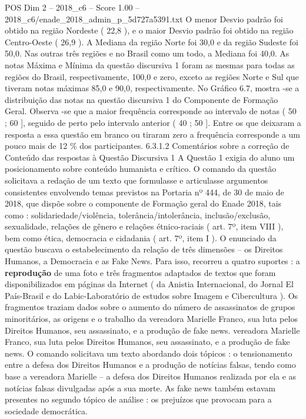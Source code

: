 \begin{textsample}{POS Dim 2 – 2018\_c6 – Score 1.00 – 2018\_c6/enade\_2018\_admin\_p\_5d727a5391.txt}
O menor Desvio padrão foi obtido na região Nordeste ( 22,8 ), e o maior Desvio padrão foi obtido na região Centro-Oeste ( 26,9 ).
A Mediana da região Norte foi 30,0 e da região Sudeste foi 50,0.
Nas outras três regiões e no Brasil como um todo, a Mediana foi 40,0.
As notas Máxima e Mínima da questão discursiva 1 foram as mesmas para todas as regiões do Brasil, respectivamente, 100,0 e zero, exceto as regiões Norte e Sul que tiveram notas máximas 85,0 e 90,0, respectivamente.
No Gráfico 6.7, mostra -se a distribuição das notas na questão discursiva 1 do Componente de Formação Geral.
Observa -se que a maior frequência corresponde ao intervalo de notas ( 50 ; 60 ], seguido de perto pelo intervalo anterior ( 40 ; 50 ].
Entre os que deixaram a resposta a essa questão em branco ou tiraram zero a frequência corresponde a um pouco mais de 12 \% dos participantes. 6.3.1.2 Comentários sobre a correção de Conteúdo das respostas à Questão Discursiva 1 A Questão 1 exigia do aluno um posicionamento sobre conteúdo humanista e crítico.
O comando da questão solicitava a redação de um texto que formulasse e articulasse argumentos consistentes envolvendo temas previstos na Portaria nº 444, de 30 de maio de 2018, que dispõe sobre o componente de Formação geral do Enade 2018, tais como : solidariedade/violência, tolerância/intolerância, inclusão/exclusão, sexualidade, relações de gênero e relações étnico-raciais ( art. 7º, item VIII ), bem como ética, democracia e cidadania ( art. 7º, item I ).
O enunciado da questão buscava o estabelecimento da relação de três dimensões – os Direitos Humanos, a Democracia e as Fake News.
Para isso, recorreu a quatro suportes : a \textbf{reprodução} de uma foto e três fragmentos adaptados de textos que foram disponibilizados em páginas da Internet ( da Anistia Internacional, do Jornal El País-Brasil e do Labic-Laboratório de estudos sobre Imagem e Cibercultura ).
Os fragmentos traziam dados sobre o aumento do número de assassinatos de grupos minoritários, as origens e o trabalho da vereadora Marielle Franco, sua luta pelos Direitos Humanos, seu assassinato, e a produção de fake news. vereadora Marielle Franco, sua luta pelos Direitos Humanos, seu assassinato, e a produção de fake news.
O comando solicitava um texto abordando dois tópicos : o tensionamento entre a defesa dos Direitos Humanos e a produção de notícias falsas, tendo como base a vereadora Marielle – a defesa dos Direitos Humanos realizada por ela e as notícias falsas divulgadas após a sua morte.
As fake news também estavam presentes no segundo tópico de análise : os prejuízos que provocam para a sociedade democrática.

\end{textsample}
